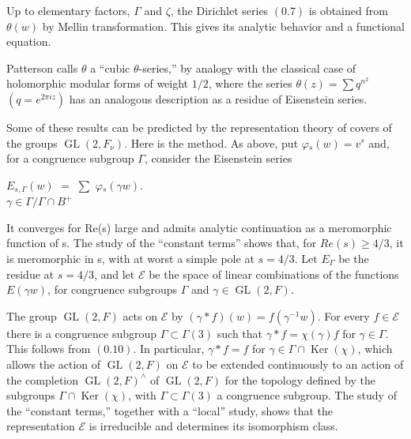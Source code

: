 \documentclass[10pt,a4paper]{article}
\begin{document}
\clearpage
{}
\label{d035-physical-006}
\par Up to elementary factors, $\Gamma{}$ and $\zeta{}$, the Dirichlet series $(0.7)$ is obtained from $\theta{}(w)$ by Mellin transformation. This gives its analytic behavior and a functional equation.\par
\par Patterson calls $\theta{}$ a ``cubic $\theta{}$-series,'' by analogy with the classical case of holomorphic modular forms of weight $1/2$, where the series $\theta{}(z)=\sum{}q^{n^{2}}$ $(q=e^{2\pi{}iz})$ has an analogous description as a residue of Eisenstein series.\par
\par Some of these results can be predicted by the representation theory of covers of the groups $\operatorname{GL}(2,F_\nu{})$. Here is the method. As above, put $\varphi{}_s(w)=v^s$ and, for a congruence subgroup $\Gamma{}$, consider the Eisenstein series\par
\par\smallskip\begin{center}\begin{minipage}{0.96\textwidth}\centering
$E_{s,\Gamma{}}(w)$ $=$ $\sum{}$ $\varphi{}_s(\gamma{}w)$. \\ $\gamma{}\in{}\Gamma{}/\Gamma{}\cap{}B^+$
\end{minipage}\end{center}\smallskip
\par It converges for Re(s) large and admits analytic continuation as a meromorphic function of s. The study of the ``constant terms'' shows that, for $Re(s)\ge{}4/3$, it is meromorphic in s, with at worst a simple pole at $s=4/3$. Let $E_\Gamma{}$ be the residue at $s=4/3$, and let $\mathcal{E}$ be the space of linear combinations of the functions $E(\gamma{}w)$, for congruence subgroups $\Gamma{}$ and $\gamma{}\in{}\operatorname{GL}(2,F)$.\par
\par The group $\operatorname{GL}(2,F)$ acts on $\mathcal{E}$ by $(\gamma{}*f)(w)=f(\gamma{}^{-1}w)$. For every $f\in{}\mathcal{E}$ there is a congruence subgroup $\Gamma{}\subset{}\Gamma{}(3)$ such that $\gamma{}*f=\chi{}(\gamma{})f$ for $\gamma{}\in{}\Gamma{}$. This follows from $(0.10)$. In particular, $\gamma{}*f=f$ for $\gamma{}\in{}\Gamma{}\cap{}\operatorname{Ker}(\chi{})$, which allows the action of $\operatorname{GL}(2,F)$ on $\mathcal{E}$ to be extended continuously to an action of the completion $\operatorname{GL}(2,F)^\wedge{}$ of $\operatorname{GL}(2,F)$ for the topology defined by the subgroups $\Gamma{}\cap{}\operatorname{Ker}(\chi{})$, with $\Gamma{}\subset{}\Gamma{}(3)$ a congruence subgroup. The study of the ``constant terms,'' together with a ``local'' study, shows that the representation $\mathcal{E}$ is irreducible and determines its isomorphism class.\par
\end{document}

